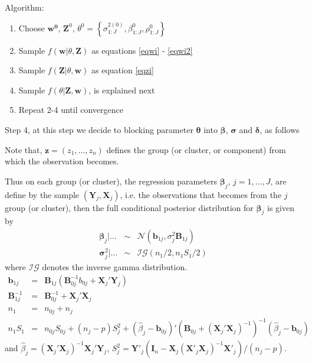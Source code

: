 \documentclass[11pt,letterpaper]{article}
\begin{document}
Algorithm:
\begin{enumerate}
    \item Choose $\mathbf{w^0}$, $\mathbf{Z}^0$, $\theta^0 = \left\{ \sigma^{2(0)}_{1:J}, \beta_{1:J}^0, \rho_{1:J}^0 \right\}$
    \item Sample $f( \mathbf{w} | \theta, \mathbf{Z} )$ as equations \eqref{eqwi} - \eqref{eqwi2}
    \item Sample $f( \mathbf{Z} | \theta, \mathbf{w} )$ as equation \eqref{eqzi}
    \item Sample $f( \theta | \mathbf{Z}, \mathbf{w})$, is explained next
    \item Repeat 2-4 until convergence
\end{enumerate}

Step 4, at this step we decide to blocking parameter $\mathbf \theta$ into $\mathbf \beta$, $\mathbf \sigma$ and $\mathbf \delta$, as follows

Note that, $\mathbf z = (z_1,\ldots , z_n)$ defines the group (or cluster, or component) from which the observation becomes.

Thus on each group (or cluster), the regression parameters $\mathbf \beta_j$, $j=1,\ldots,J$, are define by the sample $(\mathbf Y_j ,\mathbf X_j)$, i.e. the observations that becomes from the $j$ group (or cluster), then the full conditional posterior distribution for $\mathbf \beta_j$ is given by
\begin{eqnarray*}
    \mathbf{ \beta}_j | \ldots  &\sim &\mathcal{N}( \mathbf b_{1j}, \sigma^2_j \mathbf B_{1j})\\
    \mathbf \sigma^2_j | \ldots & \sim &\mathcal{IG}( n_1 / 2 , n_1S_1/2)
\end{eqnarray*}
where $\mathcal{IG}$ denotes the inverse gamma distribution.
\begin{eqnarray*}
\mathbf b_{1j} &=& \mathbf B_{1j} ( \mathbf B^{-1}_{0j}b_{0j} + \mathbf X_{j}' \mathbf Y_{j} )\\
\mathbf B_{1j}^{-1} &=& \mathbf B_{0j}^{-1} + \mathbf X_{j}'  \mathbf X_{j}\\
n_1 &=& n_{0j} + n_j\\
n_1 S_1 &=& n_{0j} S_{0j} + (n_j - p ) S_j^2 + (\hat{\beta}_j - \mathbf b_{0j})' (\mathbf B_{0j} + (\mathbf X_{j}'  \mathbf X_{j})^{-1})^{-1} (\hat{\beta}_j - \mathbf b_{0j})
\end{eqnarray*}
and $\hat{\beta}_j = (\mathbf X_{j}' \mathbf X_{j})^{-1} \mathbf X_{j}' \mathbf Y_{j} $, $S_j^2 = \mathbf Y'_j(\mathbf I_n - \mathbf X_j (\mathbf X'_j \mathbf X_j)^{-1} \mathbf X'_j)/(n_j - p)$.
\end{document}
